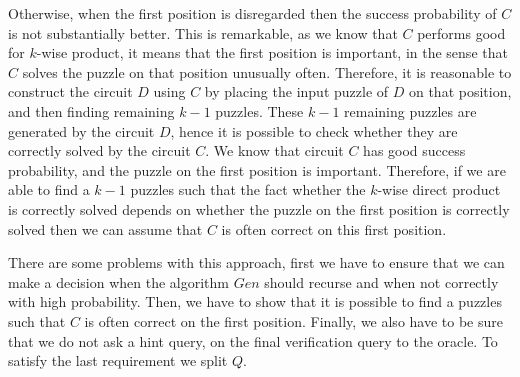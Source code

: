 Otherwise, when the first position is disregarded then the success probability of $C$ is not substantially better.
This is remarkable, as we know that $C$ performs good for $k$-wise product, it means that the first position is important,
in the sense that $C$ solves the puzzle on that position unusually often.
Therefore, it is reasonable to construct the circuit $D$ using $C$ by placing the input puzzle of $D$ on that position, and then
finding remaining $k-1$ puzzles. These $k-1$ remaining puzzles are generated by the circuit $D$, hence it is possible to check
whether they are correctly solved by the circuit $C$. We know that circuit $C$ has good success probability, and the puzzle on the first
position is important. Therefore, if we are able to find a $k-1$ puzzles such that the fact whether the $k$-wise direct product is correctly
solved depends on whether the puzzle on the first position is correctly solved then we can assume that $C$ is often correct on this first position.

There are some problems with this approach, first we have to ensure that we can make a decision when the algorithm $Gen$ should recurse and when not
correctly with high probability. Then, we have to show that it is possible to find a puzzles such that $C$ is often correct on the first position.
Finally, we also have to be sure that we do not ask a hint query, on the final verification query to the oracle.
To satisfy the last requirement we split $Q$.


